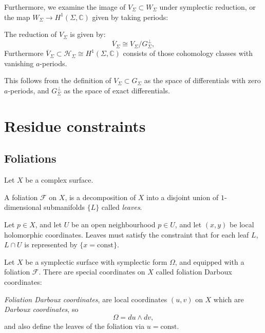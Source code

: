     Furthermore, we examine the image of \(V_\Sigma \subset W_\Sigma\) under symplectic reduction, or the map \(W_\Sigma \rightarrow H^1(\Sigma, \mathbb{C})\) given by taking periods:
    
    \begin{lem}
    \label{lem:redVSig}
    The reduction of \(V_\Sigma\) is given by:
    \[ \overline{V}_\Sigma \cong V_\Sigma/G_\Sigma^\perp,\]
    Furthermore \(\overline{V}_\Sigma\subset \mathcal{H}_\Sigma \cong H^1(\Sigma, \mathbb{C}) \) consists of those cohomology classes with vanishing \(a\)-periods. 
    \end{lem}
    This follows from the definition of \(V_\Sigma \subset G_\Sigma \) as the space of differentials with zero \(a\)-periods, and \(G^{\perp}_\Sigma\) as the space of exact differentials.
    
    
    
    
    
    \section{Residue constraints}
    \subsection{Foliations}
    Let \(X\) be a complex surface.
    \begin{defn}[Foliation] A foliation \(\mathcal{F}\) on \(X\), is a decomposition of \(X\) into a disjoint union of \(1\)-dimensional submanifolds \(\{L\}\) called \emph{leaves}.
    
    Let \(p \in X\), and let \(U\) be an open neighbourhood  \(p \in U\),  and let \((x,y)\) be local holomorphic coordinates. Leaves must satisfy the constraint that for each leaf \(L\), \(L \cap U\) is represented by \( \{x=\mathrm{const}\}\).
    \end{defn}
    
    Let \(X\) be a symplectic surface with symplectic form \( \Omega\), and equipped with a foliation \( \mathcal{F}\). There are special coordinates on \(X\) called foliation Darboux coordinates:
    
    \begin{defn}  \label{defn:FDcoord}
    \emph{Foliation Darboux coordinates}, are local coordinates \( (u,v)\) on \(X\) which are \emph{Darboux coordinates}, so
    \[ \Omega =  du\wedge dv,\]
    and also define the leaves of the foliation via \(u= \mathrm{const}\).
    \end{defn}

